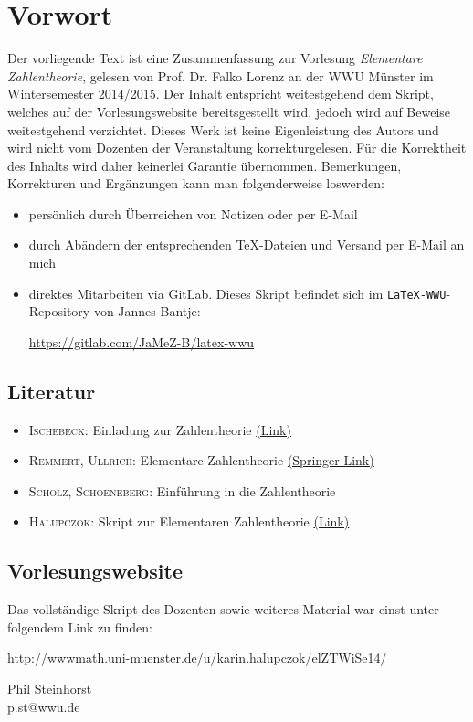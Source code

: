 \section*{Vorwort}
\label{sec:preface}
	Der vorliegende Text ist eine Zusammenfassung zur Vorlesung \textit{Elementare Zahlentheorie}, gelesen von Prof. Dr. Falko Lorenz an der WWU Münster im Wintersemester 2014/2015. Der Inhalt entspricht weitestgehend dem Skript, welches auf der Vorlesungswebsite bereitsgestellt wird, jedoch wird auf Beweise weitestgehend verzichtet. Dieses Werk ist keine Eigenleistung des Autors und wird nicht vom Dozenten der Veranstaltung korrekturgelesen. Für die Korrektheit des Inhalts wird daher keinerlei Garantie übernommen. Bemerkungen, Korrekturen und Ergänzungen kann man folgenderweise loswerden:
	\begin{itemize}
		\item persönlich durch Überreichen von Notizen oder per E-Mail
		\item durch Abändern der entsprechenden \TeX-Dateien und Versand per E-Mail an mich
		\item direktes Mitarbeiten via GitLab. Dieses Skript befindet sich im \texttt{LaTeX-WWU}-Repository von Jannes Bantje:
		\begin{center}
			\url{https://gitlab.com/JaMeZ-B/latex-wwu}
		\end{center}
	\end{itemize}

\subsection*{Literatur}
\label{sub:lit}
\begin{itemize}
	\item \textsc{Ischebeck}: Einladung zur Zahlentheorie \href{http://wwwmath.uni-muenster.de/u/ischebeck/}{(Link)} \cite{Ischebeck}
	\item \textsc{Remmert, Ullrich}: Elementare Zahlentheorie \href{http://link.springer.com/book/10.1007/978-3-7643-7731-1}{(Springer-Link)} \cite{RemmertUllrich}
	\item \textsc{Scholz, Schoeneberg}: Einführung in die Zahlentheorie \cite{ScholzSchoeneberg}
	\item \textsc{Halupczok}: Skript zur Elementaren Zahlentheorie \href{http://wwwmath.uni-muenster.de/u/karin.halupczok/ElZthSS2009Skript.pdf}{(Link)} \cite{Halupczok}
\end{itemize}

\subsection*{Vorlesungswebsite}
\label{sub:link}
Das vollständige Skript des Dozenten sowie weiteres Material war einst unter folgendem Link zu finden:
\begin{center}
	\url{http://wwwmath.uni-muenster.de/u/karin.halupczok/elZTWiSe14/}
\end{center}

\vfill
\begin{flushright}
	Phil Steinhorst \\
	p.st@wwu.de
\end{flushright}
\newpage